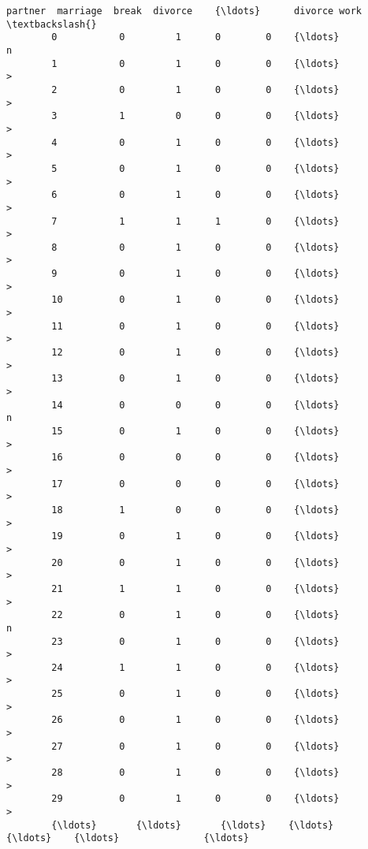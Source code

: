 \documentclass[11pt]{article}
\begin{document}
\begin{Verbatim}[commandchars=\\\{\}]
              partner  marriage  break  divorce    {\ldots}      divorce work  \textbackslash{}
        0           0         1      0        0    {\ldots}                 n   
        1           0         1      0        0    {\ldots}                 >   
        2           0         1      0        0    {\ldots}                 >   
        3           1         0      0        0    {\ldots}                 >   
        4           0         1      0        0    {\ldots}                 >   
        5           0         1      0        0    {\ldots}                 >   
        6           0         1      0        0    {\ldots}                 >   
        7           1         1      1        0    {\ldots}                 >   
        8           0         1      0        0    {\ldots}                 >   
        9           0         1      0        0    {\ldots}                 >   
        10          0         1      0        0    {\ldots}                 >   
        11          0         1      0        0    {\ldots}                 >   
        12          0         1      0        0    {\ldots}                 >   
        13          0         1      0        0    {\ldots}                 >   
        14          0         0      0        0    {\ldots}                 n   
        15          0         1      0        0    {\ldots}                 >   
        16          0         0      0        0    {\ldots}                 >   
        17          0         0      0        0    {\ldots}                 >   
        18          1         0      0        0    {\ldots}                 >   
        19          0         1      0        0    {\ldots}                 >   
        20          0         1      0        0    {\ldots}                 >   
        21          1         1      0        0    {\ldots}                 >   
        22          0         1      0        0    {\ldots}                 n   
        23          0         1      0        0    {\ldots}                 >   
        24          1         1      0        0    {\ldots}                 >   
        25          0         1      0        0    {\ldots}                 >   
        26          0         1      0        0    {\ldots}                 >   
        27          0         1      0        0    {\ldots}                 >   
        28          0         1      0        0    {\ldots}                 >   
        29          0         1      0        0    {\ldots}                 >   
        {\ldots}       {\ldots}       {\ldots}    {\ldots}      {\ldots}    {\ldots}               {\ldots}   

\end{Verbatim}
\end{document}
